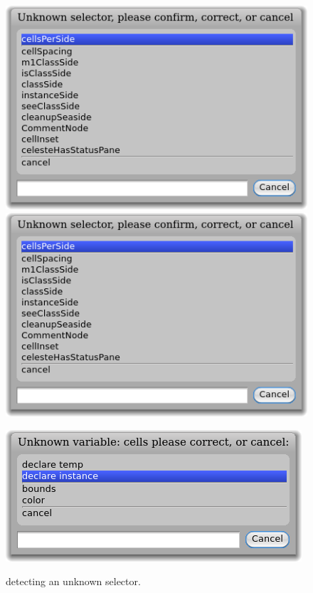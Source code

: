 \documentclass[a4paper,10pt,twoside]{book}
\begin{document}
\begin{figure}[htb]
\begin{minipage}{0.48\textwidth}
	\centering
	\ifluluelse
		{\includegraphics[width=\textwidth]{UnknownSelector}}
		{\includegraphics[scale=0.7]{UnknownSelector}}
	\caption{\pharo detecting an unknown selector.\label{fig:unknownSelector}}
\end{minipage}
\hfill
\begin{minipage}{0.48\textwidth}
	\centering
	\ifluluelse
		{\includegraphics[width=\textwidth]{DeclareInstanceVar}}

\end{minipage}
\end{figure}
\end{document}
